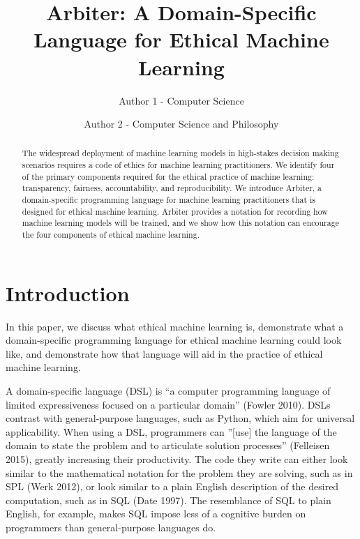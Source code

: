 \documentclass[letterpaper]{article}
\title{Arbiter: A Domain-Specific Language for Ethical Machine Learning}
\author{Author 1 - Computer Science \and Author 2 - Computer Science and Philosophy }
\begin{document}
\maketitle
\begin{abstract}
The widespread deployment of machine learning models in high-stakes decision making scenarios requires a code of ethics for machine learning practitioners. We identify four of the primary components required for the ethical practice of machine learning: transparency, fairness, accountability, and reproducibility. We introduce Arbiter, a domain-specific programming language for machine learning practitioners that is designed for ethical machine learning. Arbiter provides a notation for recording how machine learning models will be trained, and we show how this notation can encourage the four components of ethical machine learning.
\end{abstract}


\section{Introduction}
In this paper, we discuss what ethical machine learning is, demonstrate what a domain-specific programming language for ethical machine learning could look like, and demonstrate how that language will aid in the practice of ethical machine learning.

A domain-specific language (DSL) is ``a computer programming language of limited expressiveness focused on a particular domain” (Fowler 2010). DSLs contrast with general-purpose languages, such as Python, which aim for universal applicability. When using a DSL, programmers can ''[use] the language of the domain to state the problem and to articulate solution processes” (Felleisen 2015), greatly increasing their productivity. The code they write can either look similar to the mathematical notation for the problem they are solving, such as in SPL (Werk 2012), or look similar to a plain English description of the desired computation, such as in SQL (Date 1997). The resemblance of SQL to plain English, for example, makes SQL impose less of a cognitive burden on programmers than general-purpose languages do.
\end{document}
